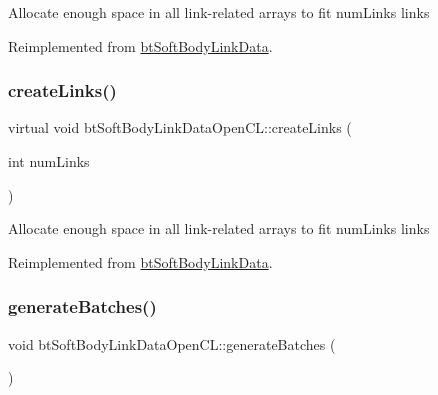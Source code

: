 Allocate enough space in all link-\/related arrays to fit num\+Links links 

Reimplemented from \hyperlink{classbtSoftBodyLinkData_a1713d14604037ca88d7915d627a32a13}{bt\+Soft\+Body\+Link\+Data}.

\mbox{\label{classbtSoftBodyLinkDataOpenCL_acc44e1a0b702ca17a5185d39e47f9b05}} 
\subsubsection{\texorpdfstring{create\+Links()}{createLinks()}\hspace{0.1cm}{\footnotesize\ttfamily [2/2]}}
{\footnotesize\ttfamily virtual void bt\+Soft\+Body\+Link\+Data\+Open\+C\+L\+::create\+Links (\begin{DoxyParamCaption}\item[{int}]{num\+Links }\end{DoxyParamCaption})\hspace{0.3cm}{\ttfamily [virtual]}}

Allocate enough space in all link-\/related arrays to fit num\+Links links 

Reimplemented from \hyperlink{classbtSoftBodyLinkData_a1713d14604037ca88d7915d627a32a13}{bt\+Soft\+Body\+Link\+Data}.

\mbox{\label{classbtSoftBodyLinkDataOpenCL_a4e968e65bfa4b5b1691a83fdee3ce48f}} 
\subsubsection{\texorpdfstring{generate\+Batches()}{generateBatches()}\hspace{0.1cm}{\footnotesize\ttfamily [1/2]}}
{\footnotesize\ttfamily void bt\+Soft\+Body\+Link\+Data\+Open\+C\+L\+::generate\+Batches (\begin{DoxyParamCaption}{ }\end{DoxyParamCaption})}

